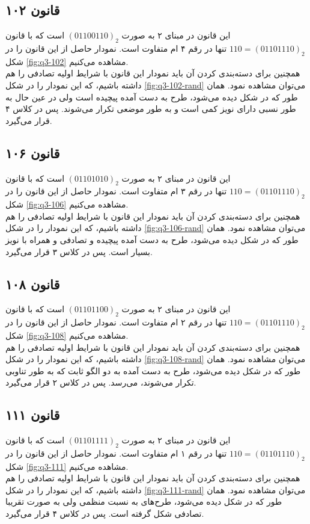\documentclass[11pt, a4paper]{article}
\begin{document}
\subsection{قانون ۱۰۲}
این قانون در مبنای ۲ به صورت $(01100110)_2$ است که با قانون $110=(01101110)_2$ تنها در رقم ۴ ام متفاوت است. نمودار حاصل از این قانون را در شکل \ref{fig:q3-102} مشاهده می‌کنیم.\\
همچنین برای دسته‌بندی کردن آن باید نمودار این قانون با شرایط اولیه تصادفی را هم داشته باشیم، که این نمودار را در شکل \ref{fig:q3-102-rand} می‌توان مشاهده نمود. همان طور که در شکل دیده می‌شود، طرح به دست آمده پیچیده است ولی در عین حال به طور نسبی دارای نویز کمی است و به طور موضعی تکرار می‌شوند. پس در کلاس ۴ قرار می‌گیرد. 

\subsection{قانون ۱۰۶}
این قانون در مبنای ۲ به صورت $(01101010)_2$ است که با قانون $110=(01101110)_2$ تنها در رقم ۳ ام متفاوت است. نمودار حاصل از این قانون را در شکل \ref{fig:q3-106} مشاهده می‌کنیم.\\
همچنین برای دسته‌بندی کردن آن باید نمودار این قانون با شرایط اولیه تصادفی را هم داشته باشیم، که این نمودار را در شکل \ref{fig:q3-106-rand} می‌توان مشاهده نمود. همان طور که در شکل دیده می‌شود، طرح به دست آمده پیچیده و تصادفی و همراه با نویز بسیار است. پس در کلاس ۳ قرار می‌گیرد.

\subsection{قانون ۱۰۸}
این قانون در مبنای ۲ به صورت $(01101100)_2$ است که با قانون $110=(01101110)_2$ تنها در رقم ۲ ام متفاوت است. نمودار حاصل از این قانون را در شکل \ref{fig:q3-108} مشاهده می‌کنیم.\\
همچنین برای دسته‌بندی کردن آن باید نمودار این قانون با شرایط اولیه تصادفی را هم داشته باشیم، که این نمودار را در شکل \ref{fig:q3-108-rand} می‌توان مشاهده نمود. همان طور که در شکل دیده می‌شود، طرح به دست آمده به دو الگو ثابت که به طور تناوبی تکرار می‌شوند، می‌رسد. پس در کلاس ۲ قرار می‌گیرد.

\subsection{قانون ۱۱۱}
این قانون در مبنای ۲ به صورت $(01101111)_2$ است که با قانون $110=(01101110)_2$ تنها در رقم ۱ ام متفاوت است. نمودار حاصل از این قانون را در شکل \ref{fig:q3-111} مشاهده می‌کنیم.\\
همچنین برای دسته‌بندی کردن آن باید نمودار این قانون با شرایط اولیه تصادفی را هم داشته باشیم، که این نمودار را در شکل \ref{fig:q3-111-rand} می‌توان مشاهده نمود. همان طور که در شکل دیده می‌شود، طرح‌های به نسبت منظمی ولی به صورت تقریبا تصادفی شکل گرفته است. پس در کلاس ۴ قرار می‌گیرد.
\end{document}
